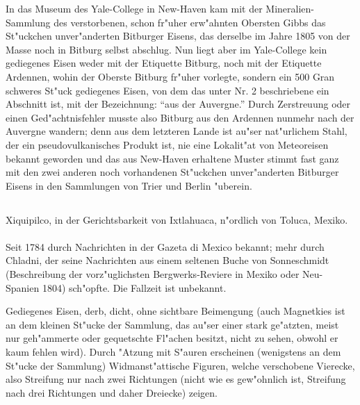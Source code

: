 \documentclass[a4paper, 11pt, oneside, polutonikogreek, german]{article}
\begin{document}
{\footnotesize In das Museum des Yale-College in New-Haven kam mit der Mineralien-Sammlung des verstorbenen, schon fr"uher erw"ahnten Obersten Gibbs das St"uckchen unver"anderten Bitburger Eisens, das derselbe im Jahre 1805 von der Masse noch in Bitburg selbst abschlug. Nun liegt aber im Yale-College kein gediegenes Eisen weder mit der Etiquette Bitburg, noch mit der Etiquette Ardennen, wohin der Oberste Bitburg fr"uher vorlegte, sondern ein 500 Gran schweres St"uck gediegenes Eisen, von dem das unter Nr. 2 beschriebene ein Abschnitt ist, mit der Bezeichnung: "`aus der Auvergne."' Durch Zerstreuung oder einen Ged"achtnisfehler musste also Bitburg aus den Ardennen nunmehr nach der Auvergne wandern; denn aus dem letzteren Lande ist au"ser nat"urlichem Stahl, der ein pseudovulkanisches Produkt ist, nie eine Lokalit"at von Meteoreisen bekannt geworden und das aus New-Haven erhaltene Muster stimmt fast ganz mit den zwei anderen noch vorhandenen St"uckchen unver"anderten Bitburger Eisens in den Sammlungen von Trier und Berlin "uberein.}

\setlength{\leftskip}{0pt}
\setlength{\parindent}{20pt}

\subsection{}
\begin{center}

Xiquipilco, in der Gerichtsbarkeit von Ixtlahuaca, n"ordlich von Toluca, Mexiko.
\end{center}
\paragraph{}
Seit 1784 durch Nachrichten in der Gazeta di Mexico bekannt; mehr durch Chladni, der seine Nachrichten aus einem seltenen Buche von Sonneschmidt (Beschreibung der vorz"uglichsten Bergwerks-Reviere in Mexiko oder Neu-Spanien 1804) sch"opfte. Die Fallzeit ist unbekannt.

Gediegenes Eisen, derb, dicht, ohne sichtbare Beimengung (auch Magnetkies ist an dem kleinen St"ucke der Sammlung, das au"ser einer stark ge"atzten, meist nur geh"ammerte oder gequetschte Fl"achen besitzt, nicht zu sehen, obwohl er kaum fehlen wird). Durch "Atzung mit S"auren erscheinen (wenigstens an dem St"ucke der Sammlung) Widmanst"attische Figuren, welche verschobene Vierecke, also Streifung nur nach zwei Richtungen (nicht wie es gew"ohnlich ist, Streifung nach drei Richtungen und daher Dreiecke) zeigen.
\end{document}
